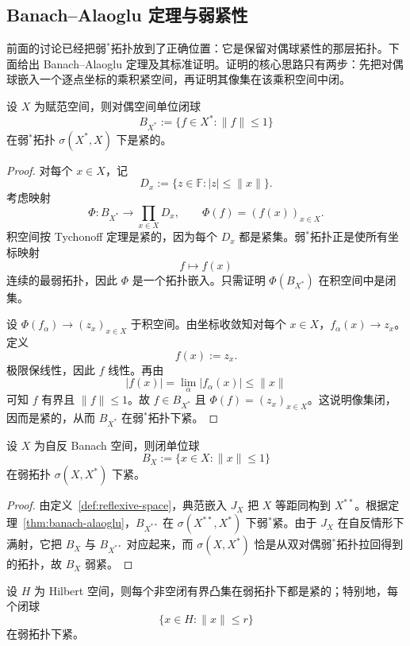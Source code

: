 \subsection{Banach--Alaoglu 定理与弱紧性}

前面的讨论已经把弱$^\ast$拓扑放到了正确位置：它是保留对偶球紧性的那层拓扑。下面给出 Banach--Alaoglu 定理及其标准证明。证明的核心思路只有两步：先把对偶球嵌入一个逐点坐标的乘积紧空间，再证明其像集在该乘积空间中闭。

\begin{theorem}\label{thm:banach-alaoglu}
设 $X$ 为赋范空间，则对偶空间单位闭球
\[
B_{X^\ast}:=\{f\in X^\ast:\|f\|\le 1\}
\]
在弱$^\ast$拓扑 $\sigma(X^\ast,X)$ 下是紧的。
\end{theorem}

\begin{proof}
对每个 $x\in X$，记
\[
D_x:=\{z\in \mathbb F:|z|\le \|x\|\}.
\]
考虑映射
\[
\Phi\colon B_{X^\ast}\to \prod_{x\in X}D_x,\qquad \Phi(f)=(f(x))_{x\in X}.
\]
积空间按 Tychonoff 定理是紧的，因为每个 $D_x$ 都是紧集。弱$^\ast$拓扑正是使所有坐标映射
\[
f\mapsto f(x)
\]
连续的最弱拓扑，因此 $\Phi$ 是一个拓扑嵌入。只需证明 $\Phi(B_{X^\ast})$ 在积空间中是闭集。

设 $\Phi(f_\alpha)\to (z_x)_{x\in X}$ 于积空间。由坐标收敛知对每个 $x\in X$，$f_\alpha(x)\to z_x$。定义
\[
f(x):=z_x.
\]
极限保线性，因此 $f$ 线性。再由
\[
|f(x)|=\lim_\alpha |f_\alpha(x)|\le \|x\|
\]
可知 $f$ 有界且 $\|f\|\le 1$。故 $f\in B_{X^\ast}$ 且 $\Phi(f)=(z_x)_{x\in X}$。这说明像集闭，因而是紧的，从而 $B_{X^\ast}$ 在弱$^\ast$拓扑下紧。
\end{proof}

\begin{proposition}[自反空间中的闭球弱紧]
设 $X$ 为自反 Banach 空间，则闭单位球
\[
B_X:=\{x\in X:\|x\|\le 1\}
\]
在弱拓扑 $\sigma(X,X^\ast)$ 下紧。
\end{proposition}

\begin{proof}
由定义~\ref{def:reflexive-space}，典范嵌入 $J_X$ 把 $X$ 等距同构到 $X^{\ast\ast}$。根据定理~\ref{thm:banach-alaoglu}，$B_{X^{\ast\ast}}$ 在 $\sigma(X^{\ast\ast},X^\ast)$ 下弱$^\ast$紧。由于 $J_X$ 在自反情形下满射，它把 $B_X$ 与 $B_{X^{\ast\ast}}$ 对应起来，而 $\sigma(X,X^\ast)$ 恰是从双对偶弱$^\ast$拓扑拉回得到的拓扑，故 $B_X$ 弱紧。
\end{proof}

\begin{corollary}\label{cor:hilbert-weak-compactness}
设 $H$ 为 Hilbert 空间，则每个非空闭有界凸集在弱拓扑下都是紧的；特别地，每个闭球
\[
\{x\in H:\|x\|\le r\}
\]
在弱拓扑下紧。
\end{corollary}

